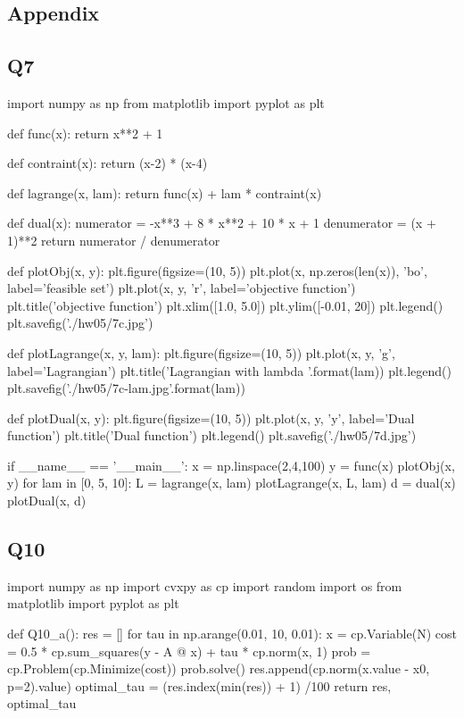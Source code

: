 \documentclass[12pt, a4 paper]{article}
\begin{document}
    \begin{framed}
        \section{Appendix}
        \subsection{Q7}
        \begin{python}
import numpy as np
from matplotlib import pyplot as plt

def func(x):
    return x**2 + 1

def contraint(x):
    return (x-2) * (x-4)

def lagrange(x, lam):
    return func(x) + lam * contraint(x)

def dual(x):
    numerator = -x**3 + 8 * x**2 + 10 * x + 1
    denumerator = (x + 1)**2
    return numerator / denumerator

def plotObj(x, y):
    plt.figure(figsize=(10, 5))
    plt.plot(x, np.zeros(len(x)), 'bo', label='feasible set')
    plt.plot(x, y, 'r', label='objective function')
    plt.title('objective function')
    plt.xlim([1.0, 5.0])
    plt.ylim([-0.01, 20])
    plt.legend()
    plt.savefig('./hw05/7c.jpg')

def plotLagrange(x, y, lam):
    plt.figure(figsize=(10, 5))
    plt.plot(x, y, 'g', label='Lagrangian')
    plt.title('Lagrangian with lambda {}'.format(lam))
    plt.legend()
    plt.savefig('./hw05/7c-lam{}.jpg'.format(lam))

def plotDual(x, y):
    plt.figure(figsize=(10, 5))
    plt.plot(x, y, 'y', label='Dual function')
    plt.title('Dual function')
    plt.legend()
    plt.savefig('./hw05/7d.jpg')


if __name__ == '__main__':
    x = np.linspace(2,4,100)
    y = func(x)
    plotObj(x, y)
    for lam in [0, 5, 10]:
        L = lagrange(x, lam)
        plotLagrange(x, L, lam)
    d = dual(x)
    plotDual(x, d)
        \end{python}

        \subsection{Q10}
        \begin{python}
import numpy as np
import cvxpy as cp
import random
import os
from matplotlib import pyplot as plt

def Q10_a():
    res = []
    for tau in np.arange(0.01, 10, 0.01):
        x = cp.Variable(N)
        cost = 0.5 * cp.sum_squares(y - A @ x) + tau * cp.norm(x, 1)
        prob = cp.Problem(cp.Minimize(cost))
        prob.solve()
        res.append(cp.norm(x.value - x0, p=2).value)
    optimal_tau = (res.index(min(res)) + 1) /100
    return res, optimal_tau


\end{python}
\end{framed}
\end{document}
